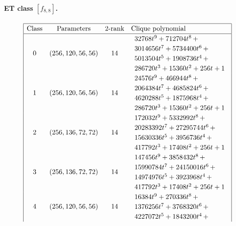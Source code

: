\documentclass[12pt,a4paper]{article}
\begin{document}
\paragraph*{ET class $[f_{8,8}]$.}
%
\begin{table}[!bhpt] %
\small{}
\begin{align*}
\def\arraystretch{1.2}
\begin{array}{|cccl|}
\hline
\text{Class} &
\text{Parameters} &
\text{2-rank} &
\text{Clique polynomial}
\\
\hline
0 &
(256, 120, 56, 56) &
14 &
\begin{array}{l}
32768t^{9} + 712704t^{8}
\,+
\\
 3014656t^{7} + 5734400t^{6}
\,+
\\
 5013504t^{5} + 1908736t^{4}
\,+
\\
 286720t^{3} + 15360t^{2} + 256t + 1
\end{array}
\\
1 &
(256, 120, 56, 56) &
14 &
\begin{array}{l}
24576t^{9} + 466944t^{8}
\,+
\\
 2064384t^{7} + 4685824t^{6}
\,+
\\
 4620288t^{5} + 1875968t^{4}
\,+
\\
 286720t^{3} + 15360t^{2} + 256t + 1
\end{array}
\\
2 &
(256, 136, 72, 72) &
14 &
\begin{array}{l}
172032t^{9} + 5332992t^{8}
\,+
\\
 20283392t^{7} + 27295744t^{6}
\,+
\\
 15630336t^{5} + 3956736t^{4}
\,+
\\
 417792t^{3} + 17408t^{2} + 256t + 1
\end{array}
\\
3 &
(256, 136, 72, 72) &
14 &
\begin{array}{l}
147456t^{9} + 3858432t^{8}
\,+
\\
 15990784t^{7} + 24150016t^{6}
\,+
\\
 14974976t^{5} + 3923968t^{4}
\,+
\\
 417792t^{3} + 17408t^{2} + 256t + 1
\end{array}
\\
4 &
(256, 120, 56, 56) &
14 &
\begin{array}{l}
16384t^{9} + 270336t^{8}
\,+
\\
 1376256t^{7} + 3768320t^{6}
\,+
\\
 4227072t^{5} + 1843200t^{4}
\,+

\end{array}
\end{array}
\end{align*}
\end{table}
\end{document}
